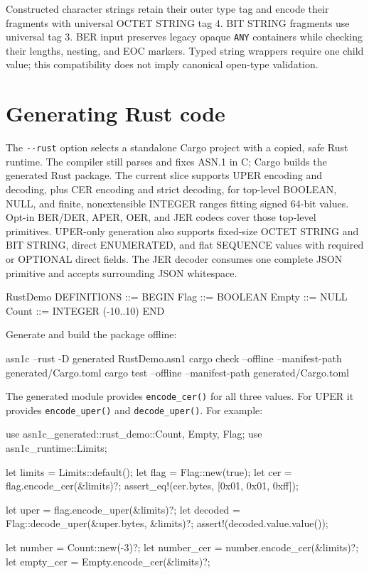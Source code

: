 \documentclass[english,oneside,12pt]{book}
\begin{document}
Constructed character strings retain their outer type tag and encode their
fragments with universal OCTET STRING tag 4. BIT STRING fragments use universal
tag 3. BER input preserves legacy opaque \texttt{ANY} containers while checking
their lengths, nesting, and EOC markers. Typed string wrappers require one
child value; this compatibility does not imply canonical open-type validation.

\section{\label{sec:Rust-output}Generating Rust code}

The \texttt{-{}-rust} option selects a standalone Cargo project with a copied,
safe Rust runtime. The compiler still parses and fixes ASN.1 in C; Cargo builds
the generated Rust package. The current slice supports UPER encoding and
decoding, plus CER encoding and strict decoding, for top-level BOOLEAN, NULL, and finite,
nonextensible INTEGER ranges fitting signed 64-bit values.
Opt-in BER/DER, APER, OER, and JER codecs cover those top-level primitives.
UPER-only generation also supports fixed-size OCTET STRING and BIT STRING,
direct ENUMERATED, and flat SEQUENCE values with required or OPTIONAL direct
fields. The JER decoder consumes one complete JSON primitive and accepts
surrounding JSON whitespace.

\begin{asn}[literate={-}{{\char45}}1]
RustDemo DEFINITIONS ::= BEGIN
Flag ::= BOOLEAN
Empty ::= NULL
Count ::= INTEGER (-10..10)
END
\end{asn}

Generate and build the package offline:

\begin{bash}[literate={-}{{\char45}}1]
asn1c --rust -D generated RustDemo.asn1
cargo check --offline --manifest-path generated/Cargo.toml
cargo test --offline --manifest-path generated/Cargo.toml
\end{bash}

The generated module provides \texttt{encode\_cer()} for all three values.
For UPER it provides \texttt{encode\_uper()} and \texttt{decode\_uper()}.
For example:

\begin{codesample}[basicstyle=\scriptsize\listingfont,literate={-}{{\char45}}1]
use asn1c_generated::rust_demo::{Count, Empty, Flag};
use asn1c_runtime::Limits;

let limits = Limits::default();
let flag = Flag::new(true);
let cer = flag.encode_cer(&limits)?;
assert_eq!(cer.bytes, [0x01, 0x01, 0xff]);

let uper = flag.encode_uper(&limits)?;
let decoded = Flag::decode_uper(&uper.bytes, &limits)?;
assert!(decoded.value.value());

let number = Count::new(-3)?;
let number_cer = number.encode_cer(&limits)?;
let empty_cer = Empty.encode_cer(&limits)?;
\end{codesample}
\end{document}
